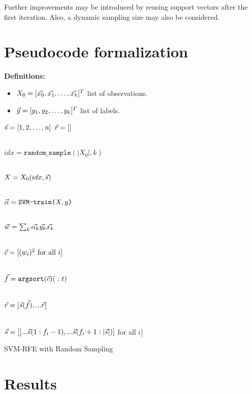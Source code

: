 Further improvements may be introduced by reusing support vectors after the first iteration. Also, a dynamic sampling size may also be considered.

\section{Pseudocode formalization}

\textbf{Definitions:}

\begin{itemize}
    \item $X_0 = [\vec{x_0}, \vec{x_1}, \dotsc, \vec{x_k}]^T$ list of observations.
    \item $\vec{y} = [y_1, y_2, \dotsc, y_k]^T$ list of labels.
\end{itemize}

\begin{algorithm}[H]
    \DontPrintSemicolon
      $\vec{s} = [1,2, \dotsc, n]$ 
      $\vec{r} = []$ 
        {
            \\
            $idx = \texttt{random\_sample}(|X_0|, k)$\VS

            \\
            $X=X_0(idx,\vec{s})$\VS

            \\
            $\vec{\alpha} = \texttt{SVM-train(} X, y \texttt{)}$\VS

            \\
            $\vec{w} = \sum_k{\vec{\alpha_k} \vec{y_k} \vec{x_k}}$\VS

            \\
            $\vec{c} = [(w_i)^2 \text{ for all $i$}]$\VS

            \\
            $\vt{f} = \texttt{argsort}(\vt{c})(\ :t)$\VS

            \\
            $\vec{r} = [\vec{s}(\vec{f}), ...\vec{r}]$\VS

            \\
            $\vec{s} = [[...\vec{s}(1:f_i - 1), ...\vec{s}(f_i + 1:|\vec{s}|)]$ for all $i]$
        }
    \caption{SVM-RFE with Random Sampling}
\end{algorithm}

\section{Results}

